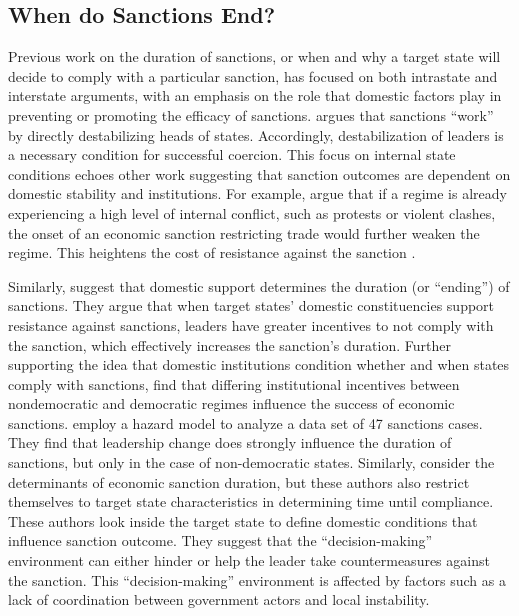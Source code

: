 \subsection*{When do Sanctions End?}
\label{lit}

Previous work on the duration of sanctions, or when and why a target state will decide to comply with a particular sanction, has focused on both intrastate and interstate arguments, with an emphasis on the role that domestic factors play in preventing or promoting the efficacy of sanctions. \cite{marinov2005} argues that sanctions ``work'' by directly destabilizing heads of states. Accordingly, destabilization of leaders is a necessary condition for successful coercion.  This focus on internal state conditions echoes other work suggesting that sanction outcomes are dependent on domestic stability and institutions. For example, {\cite{dashti1997}} argue that if a regime is already experiencing a high level of internal conflict, such as protests or violent clashes, the onset of an economic sanction restricting trade would further weaken the regime. This heightens the cost of resistance against the sanction \citep{dashti1997}. 

Similarly, \cite{dorussen2001} suggest that domestic support determines the duration (or ``ending'') of sanctions. They argue that when target states' domestic constituencies support resistance against sanctions, leaders have greater incentives to not comply with the sanction, which effectively increases the sanction's duration. Further supporting the idea that domestic institutions condition whether and when states comply with sanctions, \cite{lektzian2007} find that differing institutional incentives between nondemocratic and democratic regimes influence the success of economic sanctions. \cite{mcgillivray2004} employ a hazard model to analyze a data set of 47 sanctions cases. They find that leadership change does strongly influence the duration of sanctions, but only in the case of non-democratic states. Similarly, \cite{bolks2000} consider the determinants of economic sanction duration, but these authors also restrict themselves to target state characteristics in determining time until compliance. These authors look inside the target state to define domestic conditions that influence sanction outcome. They suggest that the ``decision-making'' environment can either hinder or help the leader take countermeasures against the sanction. This ``decision-making'' environment is affected by factors such as a lack of coordination between government actors and local instability. 


